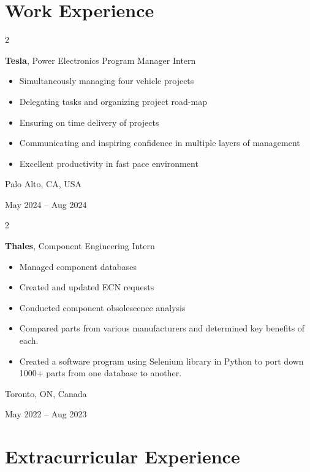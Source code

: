 \documentclass[10pt, letterpaper]{article}
\newenvironment{highlights}{
    \begin{itemize}[
        topsep=0.10 cm,
        parsep=0.10 cm,
        partopsep=0pt,
        itemsep=0pt,
        leftmargin=0.4 cm + 10pt
    ]
}{
    \end{itemize}
} %
\newenvironment{twocolentry}[2][]{
    \onecolentry
    \def\secondColumn{#2}
    \setcolumnwidth{\fill, 4.5 cm}
    \begin{paracol}{2}
}{
    \switchcolumn \raggedleft \secondColumn
    \end{paracol}
    \endonecolentry
} %
\begin{document}
    
    \section{Work Experience}

        
        \begin{twocolentry}{
            Palo Alto, CA, USA

        May 2024 – Aug 2024
        }
            \textbf{Tesla}, Power Electronics Program Manager Intern
            \begin{highlights}
                \item Simultaneously managing four vehicle projects
                \item Delegating tasks and organizing project road-map
                \item Ensuring on time delivery of projects 
                \item Communicating and inspiring confidence in multiple layers of management
                \item Excellent productivity in fast pace environment

            \end{highlights}
        \end{twocolentry}


        \vspace{0.2 cm}

        \begin{twocolentry}{
            Toronto, ON, Canada

        May 2022 – Aug 2023
        }
            \textbf{Thales}, Component Engineering Intern
            \begin{highlights}
                \item Managed component databases
                \item Created and updated ECN requests
                \item Conducted component obsolescence analysis
                \item Compared parts from various manufacturers and determined key benefits of each.
                \item Created a software program using Selenium library in Python to port down 1000+ parts from one database to another.
            \end{highlights}
        \end{twocolentry}

\section{Extracurricular Experience}
\end{document}
